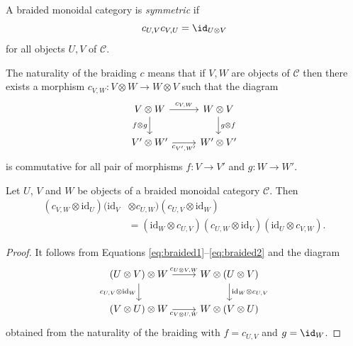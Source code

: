\begin{definition}
A braided monoidal category is \emph{symmetric} if 
\[
c_{U,V}c_{V,U}=\id_{U\otimes V}
\]
for all objects $U,V$ of $\mathcal{C}$.
\end{definition}

The naturality of the braiding $c$ means that if $V,W$ are objects
of $\mathcal{C}$ then there exists a morphism $c_{V,W}:V\otimes W\to W\otimes V$
such that the diagram 
\[
\begin{tikzcd}
V \otimes W \arrow[d, "f \otimes g"'] \arrow[r, "c_{V,W}"] & W \otimes V \arrow[d, "g \otimes f"] \\
V' \otimes W' \arrow[r, "c_{V',W'}"'] & W' \otimes V'
\end{tikzcd}
\]
is commutative for all pair of morphisms $f:V\to V'$ and $g:W\to W'$.

\begin{proposition}
Let $U$, $V$ and $W$ be objects of a braided monoidal category $\mathcal{C}$.
Then 
\begin{align*}
(c_{V,W}\otimes\textrm{id}_{U})(\textrm{id}_{V}&\otimes c_{U,W})(c_{U,V}\otimes\textrm{id}_{W})\\
&=(\textrm{id}_{W}\otimes c_{U,V})(c_{U,W}\otimes\textrm{id}_{V})(\textrm{id}_{U}\otimes c_{V,W}).
\end{align*}
\end{proposition}

\begin{proof}
It follows from Equations \eqref{eq:braided1}--\eqref{eq:braided2} and the
diagram
\[
\begin{tikzcd}
(U \otimes V) \otimes W \arrow[d, "c_{U,V} \otimes \mathrm{id}_W"'] \arrow[r, "c_{U \otimes V, W}"] 
  & W \otimes (U \otimes V) \arrow[d, "\mathrm{id}_W \otimes c_{U,V}"] \\
(V \otimes U) \otimes W \arrow[r, "c_{V \otimes U, W}"'] 
  & W \otimes (V \otimes U)
\end{tikzcd}
\]
obtained from the naturality of the braiding with
$f=c_{U,V}$ and $g=\id_W$.
\end{proof}


